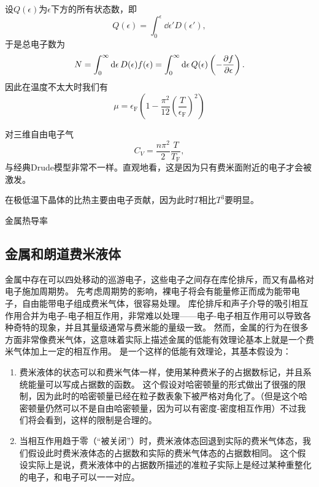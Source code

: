 设$Q(\epsilon)$为$\epsilon$下方的所有状态数，即
\begin{equation}
    Q(\epsilon) = \int_0^\epsilon \dd{\epsilon'} D(\epsilon'),
\end{equation}
于是总电子数为
\[
    N = \int_0^\infty \dd{\epsilon} D(\epsilon) f(\epsilon) = \int_0^\infty \dd{\epsilon} Q(\epsilon) \left( - \pdv{f}{\epsilon} \right).
\]
因此在温度不太大时我们有
\begin{equation}
    \mu = \epsilon_\text{F} \left( 1 - \frac{\pi^2}{12} \left( \frac{T}{\epsilon_\text{F}} \right)^2 \right)
\end{equation}

对三维自由电子气
\begin{equation}
    C_V = \frac{n \pi^2}{2} \frac{T}{T_\text{F}},
\end{equation}
与经典Drude模型非常不一样。直观地看，这是因为只有费米面附近的电子才会被激发。

在极低温下晶体的比热主要由电子贡献，因为此时$T$相比$T^3$要明显。

金属热导率

\subsection{金属和朗道费米液体}

金属中存在可以四处移动的巡游电子，这些电子之间存在库伦排斥，而又有晶格对电子施加周期势。
先考虑周期势的影响，裸电子将会有能量修正而成为能带电子，自由能带电子组成费米气体，很容易处理。
库伦排斥和声子介导的吸引相互作用合并为电子-电子相互作用，非常难以处理——电子-电子相互作用可以导致各种奇特的现象，并且其量级通常与费米能的量级一致。
然而，金属的行为在很多方面非常像费米气体，这意味着实际上描述金属的低能有效理论基本上就是一个费米气体加上一定的相互作用。
是一个这样的低能有效理论，其基本假设为：
\begin{enumerate}
    \item 费米液体的状态可以和费米气体一样，使用某种费米子的占据数标记，并且系统能量可以写成占据数的函数。
    这个假设对哈密顿量的形式做出了很强的限制，因为此时的哈密顿量已经在粒子数表象下被严格对角化了。（但是这个哈密顿量仍然可以不是自由哈密顿量，因为可以有密度-密度相互作用）不过我们将会看到，这样的限制是合理的。
    \item 当相互作用趋于零（“被关闭”）时，费米液体态回退到实际的费米气体态，我们假设此时费米液体态的占据数和实际的费米气体态的占据数相同。
    这个假设实际上是说，费米液体中的占据数所描述的准粒子实际上是经过某种重整化的电子，和电子可以一一对应。
\end{enumerate}


